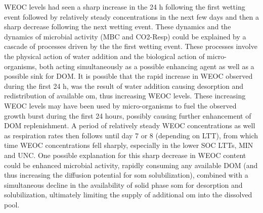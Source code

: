 \documentclass[12pt]{report}
\begin{document}
		WEOC levels had seen a sharp increase in the 24 h following the first wetting event followed by relatively steady concentrations in the next few days and then a sharp decrease following the next wetting event.
		These  dynamics and the dynamics of microbial activity (MBC and CO2-Resp) could be explained by a cascade of processes driven by the the first wetting event. These processes involve the physical action of water addition and the biological action of micro-organisms, both acting simultaneously as a possible enhancing agent as well as a possible sink for DOM. It is possible that the rapid increase in WEOC observed during the first 24 h, was the result of water addition causing desorption and redistribution of available \gls{om}, thus increasing WEOC levels. These increasing WEOC levels may have been used by micro-organisms to fuel the observed growth burst during the first 24 hours, possibly causing further enhancement of DOM replenishment.  A period of relatively steady WEOC concentrations as well as respiration rates then follows until day 7 or 8 (depending on LTT), from which time WEOC concentrations fell sharply, especially in the lower SOC LTTs, MIN and UNC.
		One possible explanation for this sharp decrease in WEOC content could be enhanced microbial activity, rapidly consuming any available DOM (and thus increasing the diffusion potential for \gls{som} solubilization), combined with a simultaneous decline in the availability of solid phase \gls{som} for desorption and solubilization, ultimately limiting the supply of additional \gls{om} into the dissolved pool.
\end{document}
